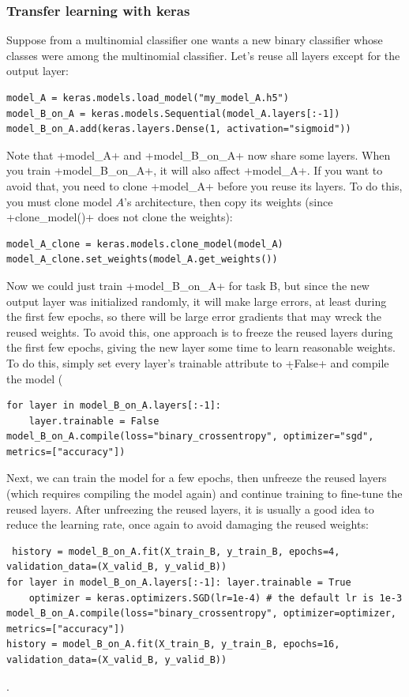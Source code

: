 \subsubsection{Transfer learning with keras}
Suppose from a multinomial classifier one wants a new binary classifier whose classes were among the multinomial classifier. Let's reuse all layers except for the output layer:
\begin{lstlisting}
model_A = keras.models.load_model("my_model_A.h5")
model_B_on_A = keras.models.Sequential(model_A.layers[:-1])
model_B_on_A.add(keras.layers.Dense(1, activation="sigmoid"))
\end{lstlisting}
Note that \cd+model_A+ and \cd+model_B_on_A+ now share some layers. When you train \cd+model_B_on_A+, it will also affect \cd+model_A+. If you want to avoid that, you need to clone \cd+model_A+ before you reuse its layers. To do this, you must clone model $A$'s architecture, then copy its weights (since \cd+clone_model()+ does not clone the weights):
\begin{lstlisting}
model_A_clone = keras.models.clone_model(model_A)
model_A_clone.set_weights(model_A.get_weights())
\end{lstlisting}
Now we could just train \cd+model_B_on_A+ for task B, but since the new output layer was initialized randomly, it will make large errors, at least during the first few epochs, so there will be large error gradients that may wreck the reused weights. To avoid this, one approach is to freeze the reused layers during the first few epochs, giving the new layer some time to learn reasonable weights. To do this, simply set every layer's trainable attribute to \d+False+ and compile the model (
\begin{lstlisting}
for layer in model_B_on_A.layers[:-1]:
    layer.trainable = False
model_B_on_A.compile(loss="binary_crossentropy", optimizer="sgd", metrics=["accuracy"])
\end{lstlisting}
Next, we can train the model for a few epochs, then unfreeze the reused layers (which requires compiling the model again) and continue training to fine-tune the reused layers. After unfreezing the reused layers, it is usually a good idea to reduce the learning rate, once again to avoid damaging the reused weights:
\begin{lstlisting}
 history = model_B_on_A.fit(X_train_B, y_train_B, epochs=4, validation_data=(X_valid_B, y_valid_B))
for layer in model_B_on_A.layers[:-1]: layer.trainable = True
    optimizer = keras.optimizers.SGD(lr=1e-4) # the default lr is 1e-3 model_B_on_A.compile(loss="binary_crossentropy", optimizer=optimizer, metrics=["accuracy"])
history = model_B_on_A.fit(X_train_B, y_train_B, epochs=16, validation_data=(X_valid_B, y_valid_B))
\end{lstlisting}
.

